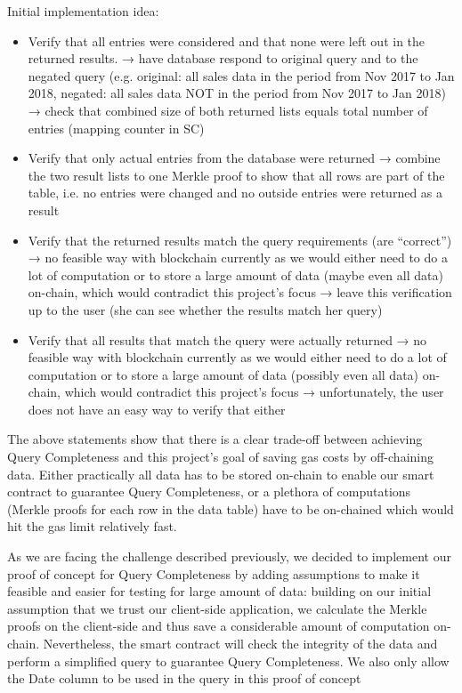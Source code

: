 Initial implementation idea:
\begin{itemize}
\item Verify that all entries were considered and that none were left out in the returned results.
→  have database respond to original query and to the negated query (e.g. original: all sales data in the period from Nov 2017 to Jan 2018, negated: all sales data NOT in the period from Nov 2017 to Jan 2018)
→ check that combined size of both returned lists equals total number of entries (mapping counter in SC)
\item Verify that only actual entries from the database were returned
→ combine the two result lists to one Merkle proof to show that all rows are part of the table, i.e. no entries were changed and no outside entries were returned as a result
\item Verify that the returned results match the query requirements (are “correct”)
→ no feasible way with blockchain currently as we would either need to do a lot of computation or to store a large amount of data (maybe even all data) on-chain, which would contradict this project’s focus
→ leave this verification up to the user (she can see whether the results match her query)
\item Verify that all results that match the query were actually returned
→ no feasible way with blockchain currently as we would either need to do a lot of computation or to store a large amount of data (possibly even all data) on-chain, which would contradict this project’s focus
→ unfortunately, the user does not have an easy way to verify that either
\end{itemize}

The above statements show that there is a clear trade-off between achieving Query Completeness and this project’s goal of saving gas costs by off-chaining data. Either practically all data has to be stored on-chain to enable our smart contract to guarantee Query Completeness, or a plethora of computations (Merkle proofs for each row in the data table) have to be on-chained which would hit the gas limit relatively fast.

As we are facing the challenge described previously, we decided to implement our proof of concept for Query Completeness by adding assumptions to make it feasible and easier for testing for large amount of data: building on our initial assumption that we trust our client-side application, we calculate the Merkle proofs on the client-side and thus save a considerable amount of computation on-chain. Nevertheless, the smart contract will check the integrity of the data and perform a simplified query to guarantee Query Completeness. We also only allow the Date column to be used in the query in this proof of concept

